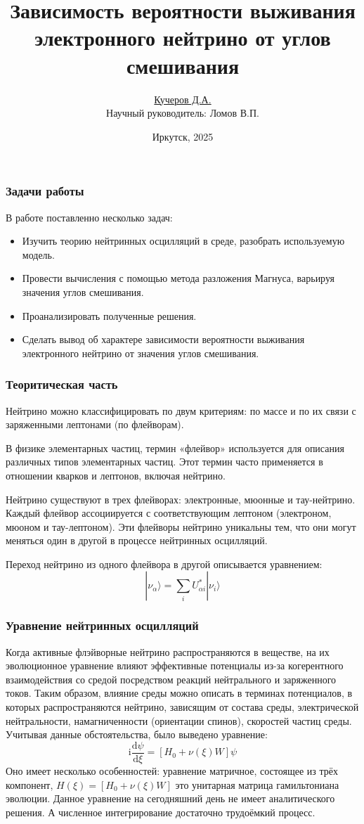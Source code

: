 \documentclass[utf8,9pt,mathserif,usepdftitle=false]{beamer}
\title{Зависимость вероятности выживания электронного нейтрино от углов
  смешивания}%
\author{\underline{Кучеров Д.А.}\\[7em]\raggedleft\footnotesize Научный руководитель:
  Ломов В.П.\\%
}%
\date[ИГУ, 2025]{\vfill%
  \small{}Иркутск, 2025}
\newcommand{\dd}{\mathrm{d}}
\renewcommand{\imath}{\mathrm{i}}
\begin{document}
\begin{frame}
  \titlepage
\end{frame}

\begin{frame}
	\frametitle{Задачи работы}
  В работе поставленно несколько задач:
  \begin{itemize}
  \item<2-> Изучить теорию нейтринных осцилляций в среде, разобрать используемую модель.
  \item<3-> Провести вычисления с помощью метода разложения Магнуса, варьируя значения углов смешивания.
  \item<4-> Проанализировать полученные решения.
  \item<5-> Сделать вывод об характере зависимости вероятности выживания электронного нейтрино от значения углов смешивания. 
  \end{itemize}
\end{frame}

\begin{frame}
	\frametitle{Теоритическая часть}%
	Нейтрино можно классифицировать по двум критериям: по массе и по их связи с
  заряженными лептонами (по флейворам).

	В физике элементарных частиц, термин «флейвор» используется для описания
  различных типов элементарных частиц. Этот термин часто применяется в отношении
  кварков и лептонов, включая нейтрино.

	Нейтрино существуют в трех флейворах: электронные, мюонные и
  тау-нейтрино. Каждый флейвор ассоциируется с соответствующим лептоном
  (электроном, мюоном и тау-лептоном). Эти флейворы нейтрино уникальны тем, что
  они могут меняться один в другой в процессе нейтринных осцилляций.

  Переход нейтрино из одного флейвора в другой описывается уравнением:
	\begin{equation}
		|\nu_{\alpha}\rangle=\sum_{i}U_{\alpha i}^{*}|\nu_{i}\rangle
	\end{equation}
\end{frame}

\begin{frame}
	\frametitle{Уравнение нейтринных осцилляций}%
	Когда активные флэйворные нейтрино распространяются в веществе, на их
  эволюционное уравнение влияют эффективные потенциалы из-за когерентного
  взаимодействия со средой посредством реакций нейтрального и заряженного
  токов. Таким образом, влияние среды можно описать в терминах потенциалов, в
  которых распространяются нейтрино, зависящим от состава среды, электрической
  нейтральности, намагниченности (ориентации спинов), скоростей частиц
  среды. Учитывая данные обстоятельства, было выведено уравнение:
	\begin{equation}\label{eq:2}
		\imath\frac{\dd\psi}{\dd\xi}=[H_{0}+\nu(\xi)W]\psi
	\end{equation}
	Оно имеет несколько особенностей: уравнение матричное, состоящее из трёх
  компонент, \(H(\xi)=[H_{0}+\nu(\xi)W]\) это унитарная матрица гамильтониана
  эволюции.  Данное уравнение на сегодняшний день не имеет аналитического
  решения. А численное интегрирование достаточно трудоёмкий процесс.
\end{frame}
\end{document}
